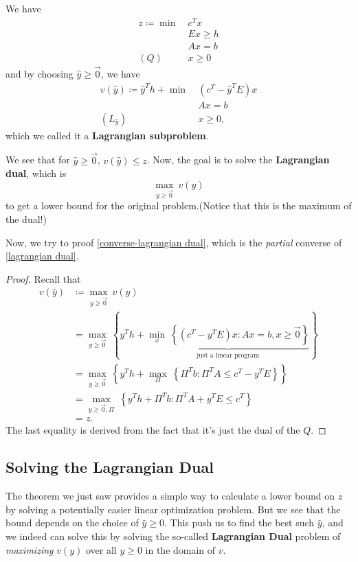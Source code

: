 \begin{prev}
	We have
	\begin{align*}
		z\coloneqq \min~ & c^{T}x    \\
		                 & Ex \geq h \\
		                 & Ax = b    \\
		(Q)\quad         & x\geq 0
	\end{align*}
	and by choosing \(\hat{y}\geq \vec{0}\), we have
	\begin{align*}
		v(\hat{y})\coloneqq \hat{y}^{T}h + \min~ & (c^{T} - \hat{y}^{T}E)x \\
		                                         & Ax = b                  \\
		(L_{\hat{y}})\quad                       & x\geq 0,
	\end{align*}
	which we called it a \textbf{Lagrangian subproblem}.

	\begin{note}
		We see that for \(\hat{y}\geq \vec{0}\), \(v(\hat{y})\leq z\). Now, the goal is to solve the
		\textbf{Lagrangian dual}, which is
		\[
			\max_{y\geq \vec{0}}\ v(y)
		\]
		to get a lower bound for the original problem.(Notice that this is the maximum of the dual!)
	\end{note}
\end{prev}

Now, we try to proof \autoref{converse-lagrangian dual}, which is the \emph{partial} converse of \autoref{lagrangian dual}.
\begin{proof}
	Recall that
	\[
		\begin{split}
			v(\hat{y})&\coloneqq \max_{y\geq \vec{0}}\ v(y) \\
			&= \max_{y\geq \vec{0}}\ \left\{y^{T}h + \underbrace{\min_{x}\ \left\{(c^{T} - y^{T}E)x\colon Ax = b, x\geq \vec{0}\right\}}_{\text{just a linear program}}\right\}\\
			&= \max_{y\geq \vec{0}}\ \left\{y^{T}h + \max_{\Pi}\ \left\{\Pi^{T}b\colon \Pi^{T}A\leq c^{T} - y^{T}E\right\}\right\}\\
			&= \max_{y\geq \vec{0}, \Pi}\ \left\{y^{T}h + \Pi^{T}b\colon \Pi^{T}A + y^{T}E\leq c^{T}\right\}\\
			&= z.
		\end{split}
	\]
	The last equality is derived from the fact that it's just the dual of the \(Q\).
\end{proof}

\subsection{Solving the Lagrangian Dual}
The theorem we just saw provides a simple way to calculate a lower bound on \(z\) by solving a potentially easier linear optimization problem.
But we see that the bound depends on the choice of \(\hat{y}\geq 0\). This push us to find the best such \(\hat{y}\), and we indeed can solve
this by solving the so-called \textbf{Lagrangian Dual} problem of \emph{maximizing} \(v(y)\) over all \(y\geq 0\) in the domain of \(v\).

